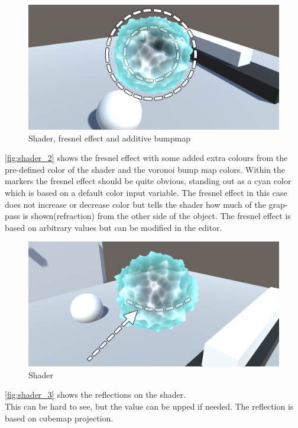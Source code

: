 \documentclass{article}
\begin{document}
\begin{figure}[H]
    \centering
    \includegraphics[width=\textwidth]{img/shader_2}
    \caption{Shader, fresnel effect and additive bumpmap}
    \label{fig:shader_2}
\end{figure}
\autoref{fig:shader_2} shows the fresnel effect with some added extra colours from the pre-defined color of the shader and the voronoi bump map colors. Within the markers the fresnel effect should be quite obvious, standing out as a cyan color which is based on a default color input variable. The fresnel effect in this case does not increase or decrease color but tells the shader how much of the grap-pass is shown(refraction) from the other side of the object. The fresnel effect is based on arbitrary values but can be modified in the editor. %

\begin{figure}[H]
    \centering
    \includegraphics[width=\textwidth]{img/shader_3}
    \caption{Shader}
    \label{fig:shader_3}
\end{figure}
\autoref{fig:shader_3} shows the reflections on the shader.\\This can be hard to see, but the value can be upped if needed. The reflection is based on cubemap projection.
\end{document}
